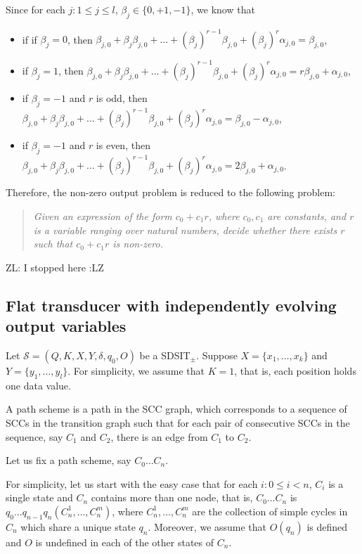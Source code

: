 \documentclass[11pt]{article}
\def\Ss{{\mathcal{S} }}
\newcommand{\zhilin}[1]{\color{cyan} {ZL: #1 :LZ} \color{black}}
\begin{document}
Since for each $j: 1 \le j \le l$, $\beta_j \in \{0,+1,-1\}$, we know that 
\begin{itemize}
\item if if $\beta_j=0$, then $\beta_{j,0} + \beta_{j} \beta_{j,0} + \dots + (\beta_j)^{r-1} \beta_{j,0} + (\beta_j)^r \alpha_{j,0}=\beta_{j,0}$,
%
\item if $\beta_j=1$, then $\beta_{j,0} + \beta_{j} \beta_{j,0} + \dots + (\beta_j)^{r-1} \beta_{j,0} + (\beta_j)^r \alpha_{j,0}=r\beta_{j,0} + \alpha_{j,0}$,
%
\item if $\beta_j = -1$ and $r$ is odd, then $\beta_{j,0} + \beta_{j} \beta_{j,0} + \dots + (\beta_j)^{r-1} \beta_{j,0} + (\beta_j)^r \alpha_{j,0}= \beta_{j,0} - \alpha_{j,0}$,

\item if $\beta_j = -1$ and $r$ is even, then $\beta_{j,0} + \beta_{j} \beta_{j,0} + \dots + (\beta_j)^{r-1} \beta_{j,0} + (\beta_j)^r \alpha_{j,0}= 2\beta_{j,0} + \alpha_{j,0}$.
\end{itemize}

Therefore, the non-zero output problem is reduced to the following problem: 
\begin{quote}
\it Given an expression of the form $c_0+c_1 r$, where $c_0 ,c_1$ are constants, and $r$ is a variable ranging over natural numbers, decide whether there exists $r$ such that $c_0+ c_1 r$ is non-zero. 
\end{quote}

\zhilin{I stopped here}


\subsection{Flat transducer with independently evolving output variables}

Let $\Ss=(Q, K, X, Y, \delta, q_0, O)$ be a SDSIT$_{\pm}$. Suppose $X=\{x_1,\dots,x_k\}$ and $Y=\{y_1,\dots,y_l\}$. For simplicity, we assume that $K = 1$, that is, each position holds one data value.

A path scheme is a path in the SCC graph, which corresponds to a sequence of SCCs in the transition graph such that for each pair of consecutive SCCs in the sequence, say $C_1$ and $C_2$, there is an edge from $C_1$ to $C_2$.

Let us fix a path scheme, say $C_0 \dots C_n$.

For simplicity, let us start with the easy case that for each $i: 0 \le i < n$, $C_i$ is a single state and $C_n$ contains more than one node, that is, $C_0 \dots C_n$ is $q_0 \dots q_{n-1} q_n (C^1_n,\dots,C^m_n)$, where $C^1_{n},\dots, C^m_n$ are the collection of simple cycles in $C_n$ which share a unique state $q_{n}$. Moreover, we assume that $O(q_n)$ is defined and $O$ is undefined in each of the other states of $C_n$.
\end{document}
